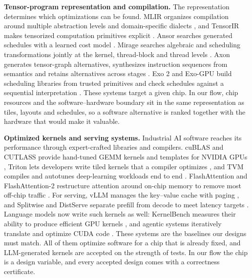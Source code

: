 \documentclass[11pt]{article}
\begin{document}
\textbf{Tensor-program representation and compilation.} The representation determines which optimizations can be found. MLIR organizes compilation around multiple abstraction levels and domain-specific dialects \cite{r21}, and TensorIR makes tensorized computation primitives explicit \cite{r22}. Ansor searches generated schedules with a learned cost model \cite{r23}. Mirage searches algebraic and scheduling transformations jointly at the kernel, thread-block and thread levels \cite{r24}. Axon generates tensor-graph alternatives, synthesizes instruction sequences from semantics and retains alternatives across stages \cite{r25}. Exo 2 and Exo-GPU build scheduling libraries from trusted primitives and check schedules against a sequential interpretation \cite{r26,r27}. These systems target a given chip. In our flow, chip resources and the software--hardware boundary sit in the same representation as tiles, layouts and schedules, so a software alternative is ranked together with the hardware that would make it valuable.

\textbf{Optimized kernels and serving systems.} Industrial AI software reaches its performance through expert-crafted libraries and compilers. cuBLAS and CUTLASS provide hand-tuned GEMM kernels and templates for NVIDIA GPUs \cite{r88,r75}, Triton lets developers write tiled kernels that a compiler optimizes \cite{r76}, and TVM compiles and autotunes deep-learning workloads end to end \cite{r79}. FlashAttention and FlashAttention-2 restructure attention around on-chip memory to remove most off-chip traffic \cite{r77,r78}. For serving, vLLM manages the key--value cache with paging \cite{r80}, and Splitwise and DistServe separate prefill from decode to meet latency targets \cite{r81,r82}. Language models now write such kernels as well: KernelBench measures their ability to produce efficient GPU kernels \cite{r73}, and agentic systems iteratively translate and optimize CUDA code \cite{r74}. These systems are the baselines our designs must match. All of them optimize software for a chip that is already fixed, and LLM-generated kernels are accepted on the strength of tests. In our flow the chip is a design variable, and every accepted design comes with a correctness certificate.
\end{document}

